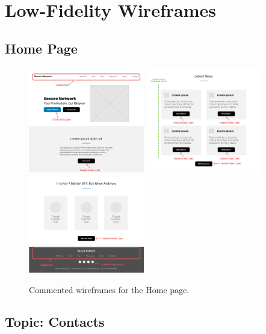 \documentclass[12pt]{report}
\begin{document}
\section{Low-Fidelity Wireframes}

\subsection{Home Page}

\begin{figure}[H]
	\centering
	\includegraphics[width=0.45\textwidth]{low_fid_wireframes/home/1.png}
	\includegraphics[width=0.45\textwidth]{low_fid_wireframes/home/2.png}
	\includegraphics[width=0.45\textwidth]{low_fid_wireframes/home/3.png}
	\caption{Commented wireframes for the Home page.}
\end{figure}

\subsection{Topic: Contacts}
\end{document}
